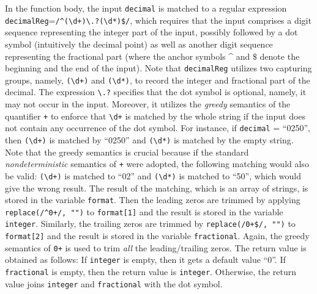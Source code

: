 In the function body, the input {\tt decimal} %
is matched to a regular expression {\tt decimalReg}={\tt /\^{}({\footnotesize\textbackslash}d+){\footnotesize\textbackslash}.?({\footnotesize\textbackslash}d*)\$/}, which requires that  the input comprises a digit sequence representing the integer part of the input, possibly followed by a dot symbol (intuitively the decimal point) as well as another digit sequence representing the fractional part (where the anchor symbols \^{} and $\$$ denote the beginning and the end of the input). Note that  {\tt decimalReg} utilizes two capturing groups, namely, {\tt ({\footnotesize\textbackslash}d+)} and {\tt ({\footnotesize\textbackslash}d*)}, to record the integer and fractional part of the decimal. The expression {\tt {\footnotesize\textbackslash}.?} specifies that the dot symbol is optional, namely, it may not occur in the input. Moreover,  it utilizes the \emph{greedy} semantics of the quantifier {\tt +} to enforce that {\tt {\footnotesize\textbackslash}d+} is matched by the whole string if the input does not contain any occurrence of the dot symbol. For instance, if {\tt decimal} = ``0250'', then {\tt ({\footnotesize\textbackslash}d+)} is matched by ``0250'' and  {\tt ({\footnotesize\textbackslash}d*)} is matched by the empty string. 
Note that the greedy semantics is crucial because if the standard \emph{nondeterministic} semantics of {\tt +} were adopted, the following matching would also be valid: {\tt ({\footnotesize\textbackslash}d+)} is matched to ``02'' and {\tt ({\footnotesize\textbackslash}d*)} is matched to ``50'', which would give the wrong result.  The result of the matching, which is an array of strings, is stored in the variable {\tt format}. 
%
Then the leading zeros are trimmed by applying {\tt replace(/\^{}0+/, "")} to {\tt format[1]} and the result is stored in the variable {\tt integer}. Similarly, the trailing zeros are trimmed by {\tt replace(/{}0+\$/, "")} to {\tt format[2]} and the result is stored in the variable {\tt fractional}. Again, the greedy semantics of {\tt 0+} is used to trim \emph{all} the leading/trailing zeros.
%
The return value is obtained as follows: If {\tt integer} is empty, then it gets a default value ``0''. If {\tt fractional} is empty, then the return value is {\tt integer}. Otherwise, the return value  joins {\tt integer} and {\tt fractional} with the dot symbol. 

